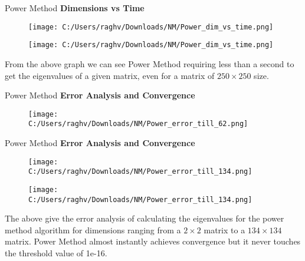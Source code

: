 \documentclass[13.5pt, aspectratio=169]{beamer}
\begin{document}
\begin{frame}{Power Method}
    \large \textbf{Dimensions vs Time}

    \begin{figure}[h]
        \centering
        \texttt{[image: C:/Users/raghv/Downloads/NM/Power\_dim\_vs\_time.png]}
        \label{fig:image2}
      \end{figure}
\end{frame}

\begin{frame}

    \begin{figure}[h]
        \centering
        \texttt{[image: C:/Users/raghv/Downloads/NM/Power\_dim\_vs\_time.png]}
        \label{fig:image2}
      \end{figure}

    From the above graph we can see Power Method requiring less than a second to get the eigenvalues of a given matrix, even for a matrix of $250 \times 250$ size.
\end{frame}

\begin{frame}{Power Method}
    \large \textbf{Error Analysis and Convergence}

    \begin{figure}[h]
        \centering
        \texttt{[image: C:/Users/raghv/Downloads/NM/Power\_error\_till\_62.png]}
        \label{fig:image2}
      \end{figure}
\end{frame}

\begin{frame}{Power Method}
    \large \textbf{Error Analysis and Convergence}

    \begin{figure}[h]
        \centering
        \texttt{[image: C:/Users/raghv/Downloads/NM/Power\_error\_till\_134.png]}
        \label{fig:image2}
      \end{figure}
\end{frame}

\begin{frame}

    \begin{figure}[h]
        \centering
        \texttt{[image: C:/Users/raghv/Downloads/NM/Power\_error\_till\_134.png]}
        \label{fig:image2}
      \end{figure}

    The above give the error analysis of calculating the eigenvalues for the power method algorithm for dimensions ranging from a $2 \times 2$ matrix to a $134 \times 134$ matrix. Power Method almost instantly achieves convergence but it never touches the threshold value of 1e-16.
\end{frame}
\end{document}
